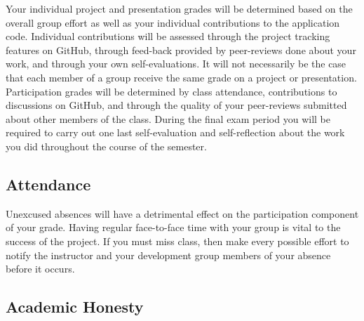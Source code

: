 \documentclass[10pt]{article}
\begin{document}
Your individual project and presentation grades will be determined based on the overall group effort as well as your individual contributions to the application code. Individual contributions will be assessed through the project tracking features on GitHub, through feed-back provided by peer-reviews done about your work, and through your own self-evaluations. It will not necessarily be the case that each member of a group receive the same grade on a project or presentation.  Participation grades will be determined by class attendance, contributions to discussions on GitHub, and through the quality of your peer-reviews submitted about other members of the class. During the final exam period you will be required to carry out one last self-evaluation and self-reflection about the work you did throughout the course of the semester.


\subsection{Attendance}

Unexcused absences will have a detrimental effect on the participation component of your grade. Having regular face-to-face time with your group is vital to the success of the project. If you must miss class, then make every possible effort to notify the instructor and your development group members of your absence before it occurs.

\subsection{Academic Honesty}
\end{document}
